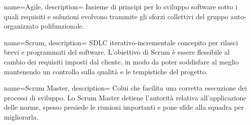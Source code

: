  {
name=Agile,
description={
Insieme di principi per lo sviluppo software sotto i quali requisiti e
soluzioni evolvono trammite gli sforzi collettivi del gruppo auto-organizzato
polifunzionale.
}
}

 {
name=Scrum,
description={
SDLC iterativo-incrementale concepito per rilasci brevi e programmati del
software. L'obiettivo di Scrum è essere flessibile al cambio dei requisiti
imposti dal cliente, in modo da poter soddisfare al meglio mantenendo un
controllo sulla qualità e le tempistiche del progetto.
}
}

 {
name=Scrum Master,
description={
Colui che facilita una corretta esecuzione dei processi di sviluppo. Lo Scrum
Master detiene l'autorità relativa all'applicazione delle norme, spesso
presiede le riunioni importanti e pone sfide alla squadra per migliorarla.
}
}
